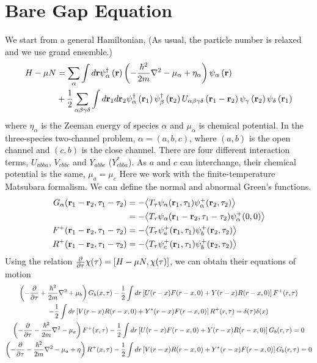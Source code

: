\section{Bare Gap Equation}
We start from a general Hamiltonian, (As usual, the particle number is relaxed and we use grand ensemble.)
\begin{equation}\label{eq:Hamiltonian}
\begin{split}
H-\mu N&=\sum_\alpha\int{d}\mathbf{r}\psi^\dagger_\alpha\left(\mathbf{r}\right)\left(-\frac{\hbar^2}{2m}\nabla^2-\mu_\alpha+\eta_\alpha\right)\psi_\alpha\left(\mathbf{r}\right)\\
&+\frac{1}{2}\sum_{\alpha\beta\gamma\delta}\int{d}\mathbf{r}_1{d}\mathbf{r}_2\psi^\dagger_\alpha\left(\mathbf{r}_1\right)\psi^\dagger_\beta\left(\mathbf{r}_2\right)U_{\alpha\beta\gamma\delta}\left(\mathbf{r}_1-\mathbf{r}_2\right)\psi_\gamma\left(\mathbf{r}_2\right)\psi_\delta\left(\mathbf{r}_1\right)
\end{split}
\end{equation}
where $\eta_\alpha$ is the Zeeman energy of species $\alpha$ and $\mu_\alpha$ is chemical potential. In the three-species two-channel problem, $\alpha=(a,b,c)$, where $(a,b)$ is the open channel and $(c,b)$ is the close channel. There are four different interaction terms,  $U_{abba}$, $V_{cbbc}$ and $Y_{abbc}$ ($Y^*_{cbba}$). As $a$ and $c$ can interchange, their chemical potential is the same, $\mu_a=\mu_c$ Here we work with the finite-temperature Matsubara formalism. We can define the normal and abnormal Green's functions.
\begin{equation}
\begin{split}
G_\alpha(\mathbf{r}_1-\mathbf{r}_2,\tau_1-\tau_2)&=-\bigl<{T_\tau\psi_\alpha(\mathbf{r}_1,\tau_1)\psi^+_\alpha(\mathbf{r}_2,\tau_2)}\bigr>\\
	&=-\bigl<{T_\tau\psi_\alpha(\mathbf{r}_1-\mathbf{r}_2,\tau_1-\tau_2)\psi^+_\alpha(0,0)}\bigr>\\
F^+(\mathbf{r}_1-\mathbf{r}_2,\tau_1-\tau_2)&=-\bigl<{T_\tau\psi^+_a(\mathbf{r}_1,\tau_1)\psi^+_b(\mathbf{r}_2,\tau_2)}\bigr>\\
R^+(\mathbf{r}_1-\mathbf{r}_2,\tau_1-\tau_2)&=-\bigl<{T_\tau\psi^+_c(\mathbf{r}_1,\tau_1)\psi^+_b(\mathbf{r}_2,\tau_2)}\bigr>	
\end{split}
\end{equation}
Using the relation $\frac{\partial{}}{\partial{\tau}}\chi(\tau)=\left[H-\mu N,\chi(\tau)\right]$,  we can obtain their equations of motion
\begin{multline}
\left(-\frac{\partial{}}{\partial{\tau}}+\frac{\hbar^2}{2m}\nabla^2+\mu_b\right)G_b(x,\tau)-\frac{1}{2}\int{dr}\left[U(r-x)F(r-x,0)+Y(r-x)R(r-x,0)\right]F^+(r,\tau)\\
	-\frac{1}{2}\int{dr}\left[V(r-x)R(r-x,0)+Y^*(r-x)F(r-x,0)\right]R^+(r,\tau)=\delta(\tau)\delta(x)\\
\left(-\frac{\partial{}}{\partial{\tau}}-\frac{\hbar^2}{2m}\nabla^2-\mu_a\right)F^+(x,\tau)-\frac{1}{2}\int{dr}\left[U(r-x)F(r-x,0)+Y(r-x)R(r-x,0)\right]G_b(r,\tau)=0\\
\left(-\frac{\partial{}}{\partial{\tau}}-\frac{\hbar^2}{2m}\nabla^2-\mu_a+\eta\right)R^+(x,\tau)-\frac{1}{2}\int{dr}\left[V(r-x)R(r-x,0)+Y^*(r-x)F(r-x,0)\right]G_b(r,\tau)=0	
\end{multline}
